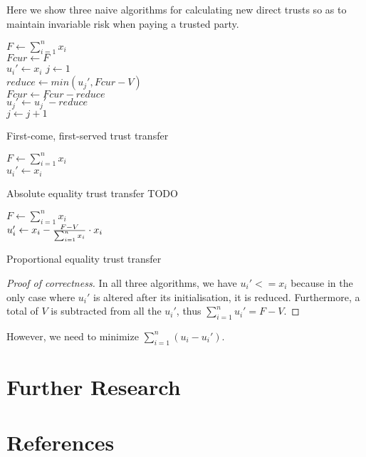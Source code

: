 \documentclass[11pt]{article}
\theoremstyle{definition}
\theoremstyle{corollary}
\begin{document}
    Here we show three naive algorithms for calculating new direct trusts so as to maintain invariable risk when paying
    a trusted party. \\
    \begin{algorithm}[H]
       $F \gets \sum_{i=1}^{n}x_i$ \\
       $Fcur \gets F$ \\
          {$u_i' \gets x_i$} 
       $j \gets 1$ \\
          {$reduce \gets min(u_j', Fcur - V)$ \\
           $Fcur \gets Fcur - reduce$ \\
           $u_j' \gets u_j' - reduce$ \\
           $j \gets j + 1$}
       \caption{First-come, first-served trust transfer}
    \end{algorithm}

    \begin{algorithm}[H]
       $F \gets \sum_{i=1}^{n}x_i$ \\
          {$u_i' \gets x_i$}
          {}
       \caption{Absolute equality trust transfer TODO}
    \end{algorithm}

    \begin{algorithm}[H]
       $F \gets \sum_{i=1}^{n}x_i$ \\
          {$u_i' \gets x_i - {{F - V} \over {\sum_{i=1}^{n}x_i}} \cdot x_i$}
          {}
       \caption{Proportional equality trust transfer}
    \end{algorithm}
    \begin{proof}[Proof of correctness]
       In all three algorithms, we have $u_i' <= x_i$ because in the only case where $u_i'$ is altered after its
       initialisation, it is reduced. Furthermore, a total of $V$ is subtracted from all the $u_i'$, thus
       $\sum_{i=1}^{n}u_i' = F - V$.
    \end{proof}

    However, we need to minimize $\sum_{i=1}^{n}(u_i-u_i')$.

  \section{Further Research}

  \section{References}
\end{document}
